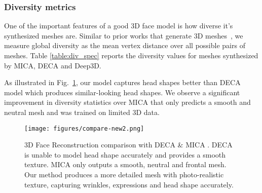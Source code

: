 \documentclass[10pt,twocolumn,letterpaper]{article}
\begin{document}
\vspace{-4mm}


\begin{table}[th]
\centering
\caption{Diversity values of randomly generated meshes for various methods. Higher is better. }
\vspace{-2mm}
\vspace{-2mm}
\end{table}




\subsubsection{Diversity metrics}

One of the important features of a good 3D face model is how diverse it's synthesized meshes are. Similar to prior works that generate 3D meshes~\cite{abrevaya2019decoupled, taherkhani2022controllable}, we measure global diversity as the mean vertex distance over all possible pairs of  meshes. Table \ref{table:div_spec} reports the diversity values for  meshes synthesized by MICA\cite{MICA:ECCV2022}, DECA\cite{deca} and Deep3D\cite{deep3dface_recon}.

As illustrated in Fig.~\ref{fig:mesh_comparison}, our model captures head shapes better than DECA model which produces similar-looking head shapes. We observe a significant improvement in diversity statistics over MICA that only predicts a smooth and neutral mesh and was trained on limited 3D data.

\begin{figure}[h]
\centering
\texttt{[image: figures/compare-new2.png]}
\caption{3D Face Reconstruction comparison with DECA\cite{deca} \& MICA \cite{MICA:ECCV2022}. DECA is unable to model head shape accurately and provides a smooth texture. MICA only outputs a smooth, neutral and frontal mesh. Our method produces a more detailed mesh with photo-realistic texture, capturing wrinkles, expressions and head shape accurately.}
\label{fig:mesh_comparison}
\vspace{-8mm}
\end{figure}
\end{document}
